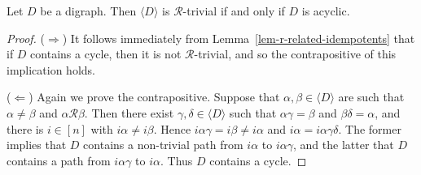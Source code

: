 \documentclass[ALCO,ThmDefs,Unicode,epreuves]{cedram}
\newcommand{\genset}[1]{\langle#1\rangle}
\newcommand{\R}{\mathcal{R}}
\newcommand{\nset}{[n]}
\begin{document}
\begin{proposition}\label{prop-r-trivial}
 Let $D$ be a digraph. Then $\genset{D}$ is $\R$-trivial if and only if $D$ is
 acyclic.
\end{proposition}
\begin{proof}
 ($\Rightarrow$) 
 It follows immediately from Lemma~\ref{lem-r-related-idempotents} that 
 if $D$ contains a cycle, then it is not $\R$-trivial, and so the
 contrapositive of this implication holds.

 ($\Leftarrow$) 
 Again we prove the contrapositive. Suppose that $\alpha,\beta\in\genset{D}$
 are such that $\alpha\not=\beta$ and $\alpha\R\beta$. Then
 there exist $\gamma,\delta\in\genset{D}$ such that 
 $\alpha\gamma=\beta$ and $\beta\delta=\alpha$, and there is
 $i\in\nset$ with $i\alpha\not=i\beta$. Hence
 $i\alpha\gamma = i\beta \not=i\alpha$ and $i\alpha=i\alpha\gamma\delta$. The
 former implies that $D$ contains a
 non-trivial path from $i\alpha$ to $i\alpha\gamma$, and the latter that $D$
 contains a path from $i\alpha\gamma$ to $i\alpha$. Thus $D$ contains a cycle.
\end{proof}
\end{document}
